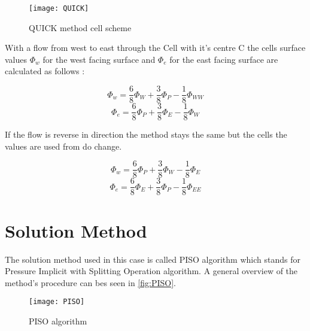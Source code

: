 \documentclass[../thesis.tex]{subfiles}
\begin{document}
\begin{figure}[htbp]
	\centering
	\texttt{[image: QUICK]}
	\caption{QUICK method cell scheme}
	\label{fig:QUICK}
\end{figure}

With a flow from west to east through the Cell with it's centre C the cells surface values $\Phi_w$ for the west facing surface and $\Phi_e$ for the east facing surface are calculated as follows \cite{versteeg2007introduction}:

\begin{equation}
	\Phi_w = \dfrac{6}{8} \Phi_W + \dfrac{3}{8} \Phi_P - \dfrac{1}{8} \Phi_{WW}
\end{equation}
\begin{equation}
	\Phi_e = \dfrac{6}{8} \Phi_P + \dfrac{3}{8} \Phi_E - \dfrac{1}{8} \Phi_{W}
\end{equation}

If the flow is reverse in direction the method stays the same but the cells the values are used from do change.

\begin{equation}
	\Phi_w = \dfrac{6}{8} \Phi_P + \dfrac{3}{8} \Phi_W - \dfrac{1}{8} \Phi_{E}
\end{equation}
\begin{equation}
	\Phi_e = \dfrac{6}{8} \Phi_E + \dfrac{3}{8} \Phi_P - \dfrac{1}{8} \Phi_{EE}
\end{equation}

\section{Solution Method}

The solution method used in this case is called PISO algorithm which stands for Pressure Implicit with Splitting Operation algorithm. A general overview of the method's procedure can bes seen in \autoref{fig:PISO}.

\begin{figure}[htbp]
	\centering
	\texttt{[image: PISO]}
	\caption{PISO algorithm}
	\label{fig:PISO}
\end{figure}
\end{document}
